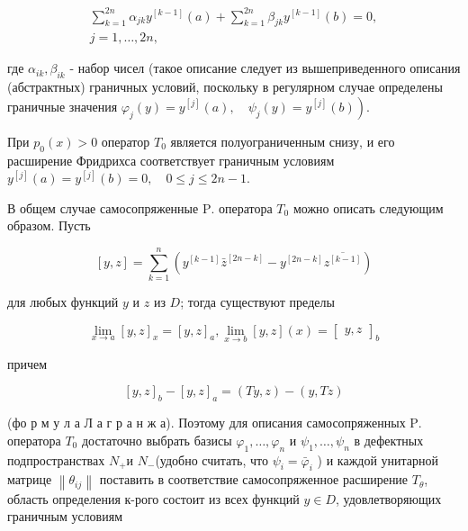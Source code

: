 \documentclass[10pt]{article}
\begin{document}
\[

\begin{gathered}

\sum_{k=1}^{2 n} \alpha_{j k} y^{[k-1]}(a)+\sum_{k=1}^{2 n} \beta_{j k} y^{[k-1]}(b)=0, \\

j=1, \ldots, 2 n,

\end{gathered}

\]



где $\alpha_{i k}, \beta_{i k}$ - набор чисел (такое описание следует из вышеприведенного описания (абстрактных) граничных условий, поскольку в регулярном случае определены граничные значения $\left.\varphi_{j}(y)=y^{[j]}(a), \quad \psi_{j}(y)=y^{[j]}(b)\right)$.



При $p_{0}(x)>0$ оператор $T_{0}$ является полуограниченным снизу, и его расширение Фридрихса соответствует граничным условиям $y^{[j]}(a)=y^{[j]}(b)=0, \quad 0 \leqslant j \leqslant 2 n-1$.



В общем случае самосопряженные $\mathrm{P}$. оператора $T_{0}$ можно описать следующим образом. Пусть



\[

[y, z]=\sum_{k=1}^{n}\left(y^{[k-1]} \bar{z}^{[2 n-k]}-y^{[2 n-k]} \overline{z^{[k-1]}}\right)

\]



для любых функций $y$ и $z$ из $D$; тогда существуют пределы



\[

\lim _{x \rightarrow a}[y, z]_{x}=[y, z]_{a}, \lim _{x \rightarrow b}[y, z](x)=\left[\begin{array}{ll}

y, z

\end{array}\right]_{b}

\]



причем



\[

[y, z]_{b}-[y, z]_{a}=(T y, z)-(y, T z)

\]



(фо р м у л а Л а г р а н ж а). Поэтому для описания самосопряженных $\mathrm{P}$. оператора $T_{0}$ достаточно выбрать базисы $\varphi_{1}, \ldots, \varphi_{n}$ и $\psi_{1}, \ldots, \psi_{n}$ в дефектных подпространствах $N_{+}$и $N_{-}$(удобно считать, что $\psi_{i}=\bar{\varphi}_{i}$ ) и каждой унитарной матрице $\left\|\theta_{i j}\right\|$ поставить в соответствие самосопряженное расширение $T_{\theta}$, область определения к-рого состоит из всех функций $y \in D$, удовлетворяющих граничным условиям
\end{document}
